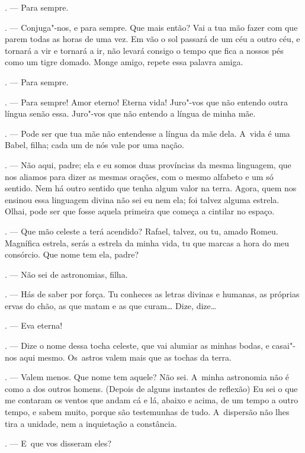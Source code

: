 \begin{linenumbers}
\begin{Parskip}
. --- Para sempre.

. --- Conjuga"-nos, e para sempre. Que mais então? Vai a tua mão
fazer com que parem todas as horas de uma vez. Em vão o sol passará de
um céu a outro céu, e tornará a vir e tornará a ir, não levará consigo o
tempo que fica a nossos pés como um tigre domado. Monge amigo, repete
essa palavra amiga.

. --- Para sempre.

. --- Para sempre! Amor eterno! Eterna vida! Juro"-vos que não
entendo outra língua senão essa. Juro"-vos que não entendo a língua de
minha mãe.

. --- Pode ser que tua mãe não entendesse a língua da mãe
dela. A~vida é uma Babel, filha; cada um de nós vale por uma nação.

. --- Não aqui, padre; ela e eu somos duas províncias da mesma
linguagem, que nos aliamos para dizer as mesmas orações, com o mesmo
alfabeto e um só sentido. Nem há outro sentido que tenha algum valor na
terra. Agora, quem nos ensinou essa linguagem divina não sei eu nem ela;
foi talvez alguma estrela. Olhai, pode ser que fosse aquela primeira que
começa a cintilar no espaço.

. --- Que mão celeste a terá acendido? Rafael, talvez, ou tu,
amado Romeu. Magnífica estrela, serás a estrela da minha vida, tu que
marcas a hora do meu consórcio. Que nome tem ela, padre?

. --- Não sei de astronomias, filha.

. --- Hás de saber por força. Tu conheces as letras divinas e
humanas, as próprias ervas do chão, as que matam e as que curam\ldots{}
Dize, dize\ldots{}

. --- Eva eterna!

. --- Dize o nome dessa tocha celeste, que vai alumiar as minhas
bodas, e casai"-nos aqui mesmo. Os~astros valem mais que as tochas da
terra.

. --- Valem menos. Que nome tem aquele? Não sei. A~minha
astronomia não é como a dos outros homens. (Depois de alguns instantes
de reflexão) Eu sei o que me contaram os ventos que andam cá e lá,
abaixo e acima, de um tempo a outro tempo, e sabem muito, porque são
testemunhas de tudo. A~dispersão não lhes tira a unidade, nem a
inquietação a constância.

. --- E~que vos disseram eles?


\end{Parskip}
\end{linenumbers}

